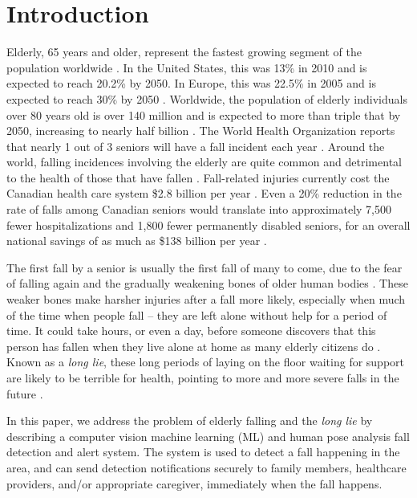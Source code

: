 \chapter{Introduction}
Elderly, 65 years and older, represent the fastest growing segment of the population worldwide \cite{AG2015}. In the United States, this was 13\% in 2010 and is expected to reach 20.2\% by 2050. In Europe, this was 22.5\% in 2005 and is expected to reach 30\% by 2050 \cite{RN1014}. Worldwide, the population of elderly individuals over 80 years old is over 140 million and is expected to more than triple that by 2050, increasing to nearly half billion \cite{AG2015}. The World Health Organization reports that nearly 1 out of 3 seniors will have a fall incident each year \cite{world2018}.  Around the world, falling incidences involving the elderly are quite common and detrimental to the health of those that have fallen \cite{fda2007}. Fall-related injuries currently cost the Canadian health care system \$2.8 billion per year \cite{RN1000}. Even a 20\% reduction in the rate of falls among Canadian seniors would translate into approximately 7,500 fewer hospitalizations and 1,800 fewer permanently disabled seniors, for an overall national savings of as much as \$138 billion per year \cite{RN1000}.



The first fall by a senior is usually the first fall of many to come, due to the fear of falling again and the gradually weakening bones of older human bodies \cite{RN1001}. These weaker bones make harsher injuries after a fall more likely, especially when much of the time when people fall – they are left alone without help for a period of time. It could take hours, or even a day, before someone discovers that this person has fallen when they live alone at home as many elderly citizens do \cite{RN1001}. Known as a \textit{long lie}, these long periods of laying on the floor waiting for support are likely to be terrible for health, pointing to more and more severe falls in the future \cite{fda2007, RN1011}.

In this paper, we address the problem of elderly falling and the \textit{long lie} by describing a computer vision machine learning (ML) and human pose analysis fall detection and alert system. The system is used to detect a fall happening in the area, and can send detection notifications securely to family members,  healthcare providers, and/or appropriate caregiver, immediately when the fall happens.

